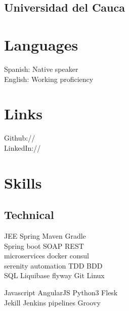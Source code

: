 \documentclass[]{deedy-resume-openfont}
\begin{document}
\begin{minipage}[t]{0.33\textwidth}
\subsection{Universidad del Cauca}
\sectionsep



\section{Languages} 
Spanish: Native speaker \\
English: Working proficiency \\
\sectionsep


\section{Links} 
Github:// \href{https://github.com/diegof00}{} \\
LinkedIn://  \href{https://www.linkedin.com/in/diegofreyes/}{} \\
\sectionsep


\section{Skills}
\subsection{Technical}
JEE \textbullet{} Spring \textbullet{} Maven \textbullet{} Gradle \\
Spring boot \textbullet{} SOAP \textbullet{} REST \\ 
microservices \textbullet{} docker \textbullet{} consul \\
serenity automation \textbullet{} TDD \textbullet{} BDD \\
SQL \textbullet{} Liquibase \textbullet{} flyway
Git \textbullet{} Linux  \\
\sectionsep

Javascript \textbullet{} AngularJS \textbullet{} Python3 \textbullet{} Flesk \\
Jekill \textbullet{} Jenkins pipelines \textbullet{} Groovy \\
\sectionsep


\end{minipage}
\end{document}
